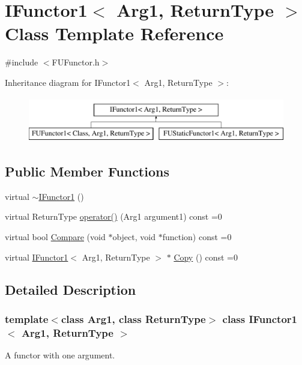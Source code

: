 \hypertarget{classIFunctor1}{
\section{IFunctor1$<$ Arg1, ReturnType $>$ Class Template Reference}
\label{classIFunctor1}
}


{\ttfamily \#include $<$FUFunctor.h$>$}

Inheritance diagram for IFunctor1$<$ Arg1, ReturnType $>$:\begin{figure}[H]
\begin{center}
\leavevmode
\includegraphics[height=2.000000cm]{classIFunctor1}
\end{center}
\end{figure}
\subsection*{Public Member Functions}
\begin{DoxyCompactItemize}
\item 
virtual \hyperlink{classIFunctor1_a321ec2a81d7eb93972b40795667b08a8}{$\sim$IFunctor1} ()
\item 
virtual ReturnType \hyperlink{classIFunctor1_a01a0d99708e1bc5477f4d8058c0b0a8d}{operator()} (Arg1 argument1) const =0
\item 
virtual bool \hyperlink{classIFunctor1_af40dabb69bb64dcd2b4da5a76d0a0c95}{Compare} (void $\ast$object, void $\ast$function) const =0
\item 
virtual \hyperlink{classIFunctor1}{IFunctor1}$<$ Arg1, ReturnType $>$ $\ast$ \hyperlink{classIFunctor1_a9a7f152e50293268e2921ee19b25ed56}{Copy} () const =0
\end{DoxyCompactItemize}


\subsection{Detailed Description}
\subsubsection*{template$<$class Arg1, class ReturnType$>$ class IFunctor1$<$ Arg1, ReturnType $>$}

A functor with one argument. 

